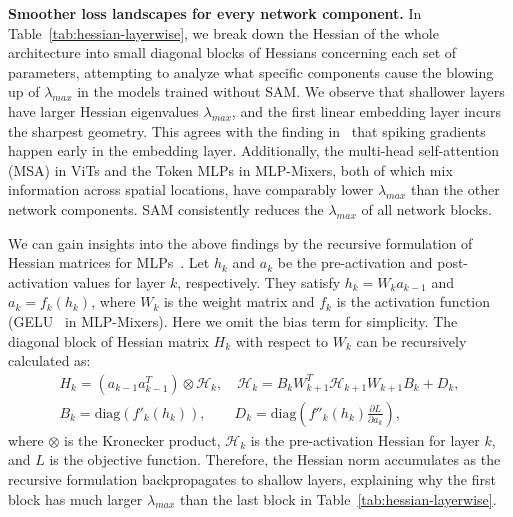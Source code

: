 \documentclass{article}
\begin{document}
\textbf{Smoother loss landscapes for every network component.}
In Table~\ref{tab:hessian-layerwise}, we break down the Hessian of the whole architecture into small diagonal blocks of Hessians concerning each set of parameters, attempting to analyze what specific components cause the blowing up of  $\lambda_{max}$ in the models trained without SAM.
We observe that shallower layers have larger Hessian eigenvalues $\lambda_{max}$,
and the first linear embedding layer incurs the sharpest geometry.
This agrees with the finding in~\cite{chen2021empirical} that spiking gradients happen early in the embedding layer.
Additionally, the multi-head self-attention (MSA) in ViTs and the Token MLPs in MLP-Mixers, both of which mix information across spatial locations, have comparably lower $\lambda_{max}$ than the other network components.
SAM consistently reduces the $\lambda_{max}$ of all network blocks.



We can gain insights into the above findings  by the recursive formulation of Hessian matrices for MLPs~\cite{aleksandar2017practical}. 
Let $h_k$ and $a_k$ be the pre-activation and post-activation values for layer $k$, respectively. They satisfy $h_k = W_k a_{k-1}$ and $a_k = f_k(h_k)$, where $W_k$ is the weight matrix and $f_k$ is the activation function (GELU~\cite{hendrycks2020gaussian} in MLP-Mixers). Here we omit the bias term for simplicity.
The diagonal block of Hessian matrix $H_k$ with respect to $W_k$ can be recursively calculated as:
\begin{align}
    H_k = (a_{k-1} a_{k-1}^T)\otimes \mathcal{H}_k, \quad
    \mathcal{H}_k = B_k W_{k+1}^T\mathcal{H}_{k+1}W_{k+1}B_k + D_k, \label{eq:hessian1}  \\
    B_k = \text{diag}(f'_k(h_k)),\qquad D_k = \text{diag}(f''_k(h_k)\frac{\partial L}{\partial a_k}), \label{eq:hessian3}
\end{align}
where $\otimes$ is the Kronecker product, $\mathcal{H}_k$ is the pre-activation Hessian for layer $k$, and $L$ is the objective function. 
Therefore, the Hessian norm accumulates as the recursive formulation backpropagates to shallow layers, explaining why the first block has much larger $\lambda_{max}$ than the last block in Table~\ref{tab:hessian-layerwise}.
\end{document}
